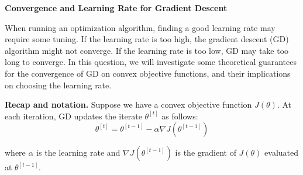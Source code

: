 \item {}	{\bf Convergence and Learning Rate for Gradient Descent}

When running an optimization algorithm, finding a good learning rate may require some tuning. 
If the learning rate is too high, the gradient descent (GD) algorithm might not converge. If the learning rate is too low, GD may take too long to converge.
In this question, we will investigate some theoretical guarantees for the convergence of GD on convex objective functions, and their implications on choosing the learning rate.

{\bf Recap and notation.} Suppose we have a convex
objective function $J(\theta)$. At each iteration, GD updates the iterate $\theta^{[t]}$ as 
follows:
\begin{equation*}
	\theta^{[t]} = \theta^{[t-1]} - \alpha\nabla J(\theta^{[t-1]})
\end{equation*}

where $\alpha$ is the learning rate and $\nabla J(\theta^{[t-1]})$ is the gradient of $J(\theta)$ evaluated at $\theta^{[t-1]}$.

\begin{enumerate}



  





	





	





	





	




\end{enumerate}